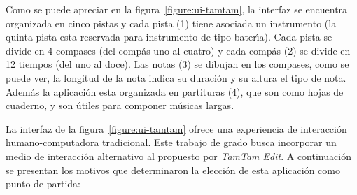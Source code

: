 Como se puede apreciar en la figura~\ref{figure:ui-tamtam}, la interfaz se encuentra organizada en cinco pistas 
y cada pista (1) tiene asociada un 
instrumento (la quinta pista esta reservada para instrumento de tipo bater{\'\i}a). Cada pista se divide en 4 
compases (del comp\'as uno al cuatro) y cada comp\'as (2) se divide en 12 tiempos (del uno al doce). 
Las notas (3) se dibujan en los compases, como se puede ver, la longitud de la nota indica su duraci\'on y su 
altura el tipo de nota. Adem\'as la aplicaci\'on esta organizada en partituras (4), que son como hojas de 
cuaderno, y son \'utiles para componer m\'usicas largas.

La interfaz de la figura~\ref{figure:ui-tamtam} ofrece una experiencia de interacci\'on humano-computadora 
tradicional. 
Este trabajo de grado busca incorporar un medio de interacci\'on alternativo al propuesto por \emph{TamTam Edit}. 
A continuaci\'on se presentan los motivos que determinaron la elecci\'on de esta aplicaci\'on como punto de partida:

